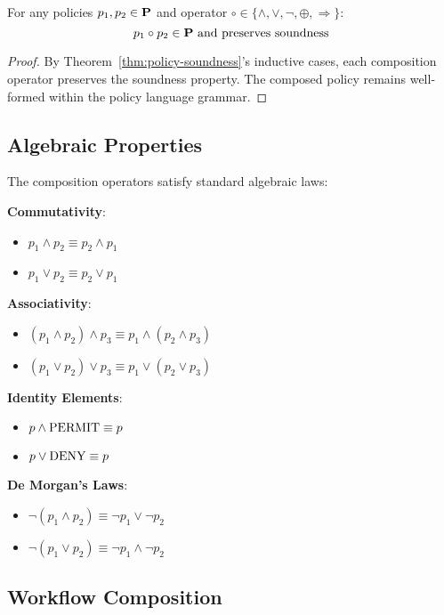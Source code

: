 \begin{theorem}
\label{thm:policy-closure}
For any policies $p_1, p_2 \in \mathbf{P}$ and operator $\circ \in \{\land, \lor, \neg, \oplus, \Rightarrow\}$:
\begin{equation}
p_1 \circ p_2 \in \mathbf{P} \text{ and preserves soundness}
\end{equation}
\end{theorem}

\begin{proof}
By Theorem~\ref{thm:policy-soundness}'s inductive cases, each composition operator preserves the soundness property. The composed policy remains well-formed within the policy language grammar.
\end{proof}

\subsection{Algebraic Properties}

The composition operators satisfy standard algebraic laws:

\textbf{Commutativity}:
\begin{itemize}
\item $p_1 \land p_2 \equiv p_2 \land p_1$
\item $p_1 \lor p_2 \equiv p_2 \lor p_1$
\end{itemize}

\textbf{Associativity}:
\begin{itemize}
\item $(p_1 \land p_2) \land p_3 \equiv p_1 \land (p_2 \land p_3)$
\item $(p_1 \lor p_2) \lor p_3 \equiv p_1 \lor (p_2 \lor p_3)$
\end{itemize}

\textbf{Identity Elements}:
\begin{itemize}
\item $p \land \text{PERMIT} \equiv p$
\item $p \lor \text{DENY} \equiv p$
\end{itemize}

\textbf{De Morgan's Laws}:
\begin{itemize}
\item $\neg(p_1 \land p_2) \equiv \neg p_1 \lor \neg p_2$
\item $\neg(p_1 \lor p_2) \equiv \neg p_1 \land \neg p_2$
\end{itemize}

\subsection{Workflow Composition}

